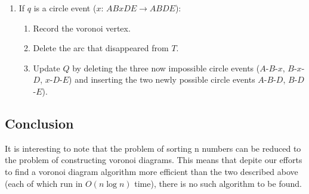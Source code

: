 \documentclass[10pt]{article}
\begin{document}
{\begin{enumerate}
\begin{enumerate}
\begin{enumerate}
\end{enumerate}

\item If $q$ is a circle event ($x$: $A B x D E \rightarrow A B D E$):

\begin{enumerate}

\item Record the voronoi vertex.

\item Delete the arc that disappeared from $T$.

\item Update $Q$ by deleting the three now impossible circle events ($A$-$B$-$x$,
$B$-$x$-$D$, $x$-$D$-$E$) and inserting the two newly possible circle events 
$A$-$B$-$D$, $B$-$D$-$E$).

\end{enumerate}

\end{enumerate}

\end{enumerate}
\hrulefill}

\subsection{Conclusion}

It is interesting to note that the problem of sorting n numbers can be
reduced to the problem of constructing voronoi diagrams.  This means that
depite our efforts to find a voronoi diagram algorithm more efficient
than the two described above (each of which run in $O(n \log n)$ time), there 
is no such algorithm to be found.
\end{document}
